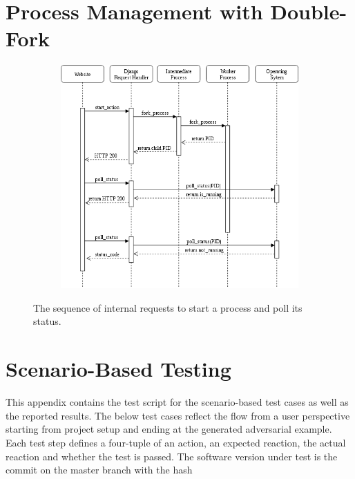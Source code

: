 \clearpage
\appendix
\section{Process Management with Double-Fork}\label{app:doublefork}
\begin{figure}[H]\label{fig:process_sequence}
	\centering
	\begin{subfigure}{1.2\linewidth}
		\centering
		\includegraphics[width=1.2\linewidth]{figs/process_sequence}
	\end{subfigure}
	\caption{The sequence of internal requests to start a process and poll its status.}
\end{figure}

\clearpage
\section{Scenario-Based Testing}\label{app:scenariotest}
This appendix contains the test script for the scenario-based test cases as well as the reported results.
The below test cases reflect the flow from a user perspective starting from project setup and ending at the generated adversarial example.
Each test step defines a four-tuple of an action, an expected reaction, the actual reaction and whether the test is passed.
The software version under test is the commit on the master branch with the hash %

